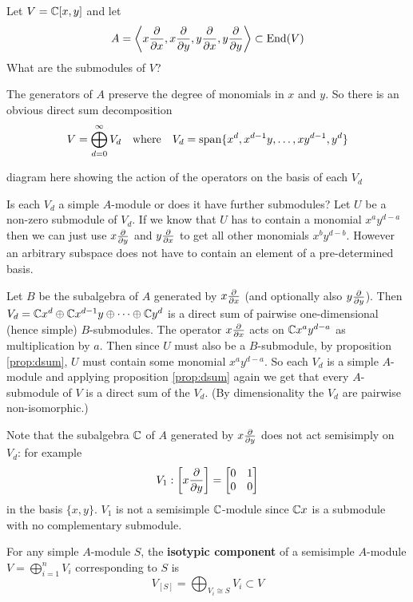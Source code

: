 \begin{exam}
	Let $V = \mathbb{C}[x,y]$ and let
	\[A = {\left\langle x \frac{\partial}{\partial x}, x \frac{\partial}{\partial y}, y \frac{\partial}{\partial x}, y \frac{\partial}{\partial y} \right\rangle} \subset \operatorname{End}(V)\]
	What are the submodules of $V$?
	
	The generators of $A$ preserve the degree of monomials in $x$ and $y$.
	So there is an obvious direct sum decomposition
	\[V = \bigoplus_{d=0}^\infty V_d \quad \mbox{where} \quad V_d = \operatorname{span}\{x^d,x^{d-1}y,\ldots,xy^{d-1},y^d\}\]
	
	diagram here showing the action of the operators on the basis of each $V_d$
	
	Is each $V_d$ a simple $A$-module or does it have further submodules?
	Let $U$ be a non-zero submodule of $V_d$.
	If we know that $U$ has to contain a monomial $x^ay^{d-a}$ then we can just use $x \tfrac{\partial}{\partial y}$ and $y \tfrac{\partial}{\partial x}$ to get all other monomials $x^by^{d-b}$.
	However an arbitrary subspace does not have to contain an element of a pre-determined basis.
	
	Let $B$ be the subalgebra of $A$ generated by $x \tfrac{\partial}{\partial x}$ (and optionally also $y \tfrac{\partial}{\partial y}$).
	Then $V_d = \mathbb{C} x^d \oplus \mathbb{C} x^{d-1}y \oplus \cdots \oplus \mathbb{C} y^d$ is a direct sum of pairwise one-dimensional (hence simple) $B$-submodules.
	The operator $x \tfrac{\partial}{\partial x}$ acts on $\mathbb{C} x^a y^{d-a}$ as multiplication by $a$.
	Then since $U$ must also be a $B$-submodule, by proposition \ref{prop:dsum}, $U$ must contain some monomial $x^a y^{d-a}$.
	So each $V_d$ is a simple $A$-module and applying proposition \ref{prop:dsum} again we get that every $A$-submodule of $V$ is a direct sum of the $V_d$.
	(By dimensionality the $V_d$ are pairwise non-isomorphic.)
	
	Note that the subalgebra $\mathbb{C}$ of $A$ generated by $x \tfrac{\partial}{\partial y}$ does not act semisimply on $V_d$: for example
	\[V_1: \left[x \frac{\partial}{\partial y}\right] =
		\begin{bmatrix}
			0 & 1 \\
			0 & 0
		\end{bmatrix}
	\]
	in the basis $\{x,y\}$.
	$V_1$ is not a semisimple $\mathbb{C}$-module since $\mathbb{C} x$ is a submodule with no complementary submodule.
\end{exam}

\begin{defn}
	For any simple $A$-module $S$, the \textbf{isotypic component} of a semisimple $A$-module $V = \bigoplus_{i=1}^n V_i$ corresponding to $S$ is
	\[V_{[S]} = \bigoplus_{V_i \cong S}V_i \subset V\]
\end{defn}

